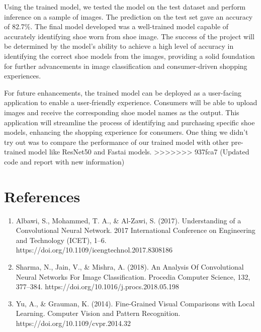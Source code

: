 \documentclass[11pt,a4paper]{article}
\begin{document}
Using the trained model, we tested the model on the test dataset and perform inference on a sample of images.  The prediction on the test set gave an accuracy of 82.7\%.  The final model developed was a well-trained model capable of accurately identifying shoe worn from shoe image. The success of the project will be determined by the model's ability to achieve a high level of accuracy in identifying the correct shoe models from the images, providing a solid foundation for further advancements in image classification and consumer-driven shopping experiences. 

For future enhancements, the trained model can be deployed as a user-facing application to enable a user-friendly experience. Consumers will be able to upload images and receive the corresponding shoe model names as the output. This application will streamline the process of identifying and purchasing specific shoe models, enhancing the shopping experience for consumers.  One thing we didn't try out was to compare the performance of our trained model with other pre-trained model like ResNet50 and Fastai models.
>>>>>>> 937fca7 (Updated code and report with new information)
\section{References} 
		\begin{enumerate}
		\item Albawi, S., Mohammed, T. A., \& Al-Zawi, S. (2017). Understanding of a Convolutional Neural Network. 2017 International Conference on Engineering and Technology (ICET), 1–6. https://doi.org/10.1109/icengtechnol.2017.8308186  
		\item Sharma, N., Jain, V., \& Mishra, A. (2018). An Analysis Of Convolutional Neural Networks For Image Classification. Procedia Computer Science, 132, 377–384. https://doi.org/10.1016/j.procs.2018.05.198
		\item Yu, A., \& Grauman, K. (2014). Fine-Grained Visual Comparisons with Local Learning. Computer Vision and Pattern Recognition. https://doi.org/10.1109/cvpr.2014.32 
		\end{enumerate}
\end{document}
